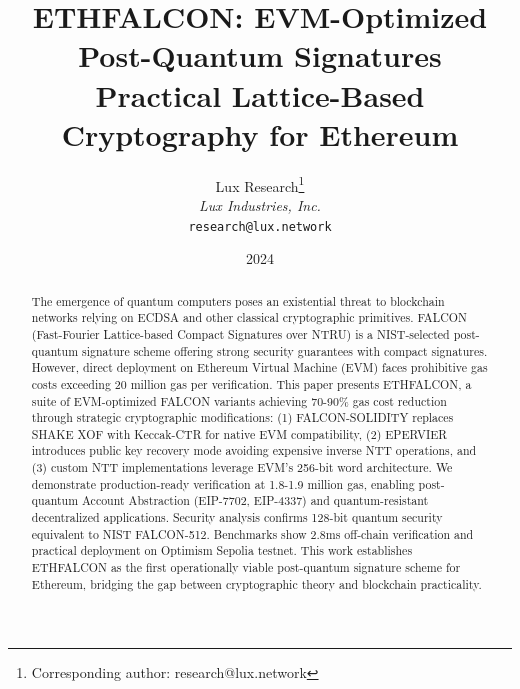 \documentclass[11pt,a4paper]{article}
\title{\textbf{ETHFALCON: EVM-Optimized Post-Quantum Signatures}\\
\large{Practical Lattice-Based Cryptography for Ethereum}}
\author{
Lux Research\thanks{Corresponding author: research@lux.network}\\
\textit{Lux Industries, Inc.}\\
\texttt{research@lux.network}
}
\date{2024}
\begin{document}
\luxcoverpage

\begin{abstract}
The emergence of quantum computers poses an existential threat to blockchain networks relying on ECDSA and other classical cryptographic primitives. FALCON (Fast-Fourier Lattice-based Compact Signatures over NTRU) is a NIST-selected post-quantum signature scheme offering strong security guarantees with compact signatures. However, direct deployment on Ethereum Virtual Machine (EVM) faces prohibitive gas costs exceeding 20 million gas per verification. This paper presents ETHFALCON, a suite of EVM-optimized FALCON variants achieving 70-90\% gas cost reduction through strategic cryptographic modifications: (1) FALCON-SOLIDITY replaces SHAKE XOF with Keccak-CTR for native EVM compatibility, (2) EPERVIER introduces public key recovery mode avoiding expensive inverse NTT operations, and (3) custom NTT implementations leverage EVM's 256-bit word architecture. We demonstrate production-ready verification at 1.8-1.9 million gas, enabling post-quantum Account Abstraction (EIP-7702, EIP-4337) and quantum-resistant decentralized applications. Security analysis confirms 128-bit quantum security equivalent to NIST FALCON-512. Benchmarks show 2.8ms off-chain verification and practical deployment on Optimism Sepolia testnet. This work establishes ETHFALCON as the first operationally viable post-quantum signature scheme for Ethereum, bridging the gap between cryptographic theory and blockchain practicality.
\end{abstract}












\end{document}
